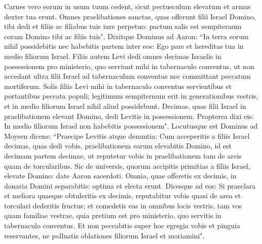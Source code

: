 \begin{biblechapter}
\verse Carnes vero eorum in usum tuum cedent, sicut pectusculum elevatum et armus dexter tua erunt. 
\verse Omnes praelibationes sanctas, quas offerunt filii Israel Domino, tibi dedi et filiis ac filiabus tuis iure perpetuo: pactum salis est sempiternum coram Domino tibi ac filiis tuis". 
\verse Dixitque Dominus ad Aaron: “In terra eorum nihil possidebitis nec habebitis partem inter eos: Ego pars et hereditas tua in medio filiorum Israel. 
\verse Filiis autem Levi dedi omnes decimas Israelis in possessionem pro ministerio, quo serviunt mihi in tabernaculo conventus, 
\verse ut non accedant ultra filii Israel ad tabernaculum conventus nec committant peccatum mortiferum.  
\verse Solis filiis Levi mihi in tabernaculo conventus servientibus et portantibus peccata populi; legitimum sempiternum erit in generationibus vestris, et in medio filiorum Israel nihil aliud possidebunt. 
\verse Decimas, quas filii Israel in praelibationem elevant Domino, dedi Levitis in possessionem. Propterea dixi eis: In medio filiorum Israel non habebitis possessionem". 
\verse Locutusque est Dominus ad Moysen dicens: 
\verse “Praecipe Levitis atque denuntia: Cum acceperitis a filiis Israel decimas, quas dedi vobis, praelibationem earum elevabitis Domino, id est decimam partem decimae, 
\verse ut reputetur vobis in praelibationem tam de areis quam de torcularibus. 
\verse Sic de universis, quorum accipitis primitias a filiis Israel, elevate Domino: date Aaron sacerdoti. 
\verse Omnia, quae offeretis ex decimis, in donaria Domini separabitis: optima et electa erunt. 
\verse Dicesque ad eos: Si praeclara et meliora quaeque obtuleritis ex decimis, reputabitur vobis quasi de area et torculari dederitis fructus; 
\verse et comedetis eas in omnibus locis vestris, tam vos quam familiae vestrae, quia pretium est pro ministerio, quo servitis in tabernaculo conventus. 
\verse Et non peccabitis super hoc egregia vobis et pinguia reservantes, ne polluatis oblationes filiorum Israel et moriamini". 
\end{biblechapter}

